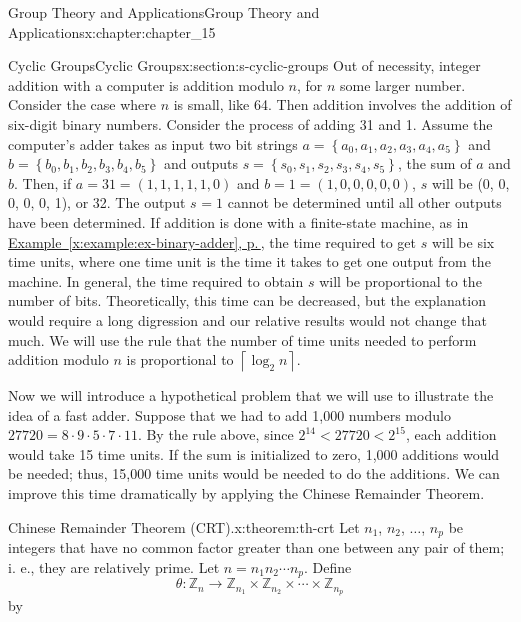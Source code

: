 \documentclass[twoside,10pt,]{book}
\newcommand{\xreffont}{\relax}
\numberwithin{equation}{section}
\begin{document}
\begin{chapterptx}{Group Theory and Applications}{}{Group Theory and Applications}{}{}{x:chapter:chapter_15}
\begin{sectionptx}{Cyclic Groups}{}{Cyclic Groups}{}{}{x:section:s-cyclic-groups}
Out of necessity, integer addition with a computer is addition modulo \(n\), for \(n\) some larger number. Consider the case where \(n\) is small, like 64. Then addition involves the addition of six-digit binary numbers. Consider the process of adding 31 and 1. Assume the computer's adder takes as input two bit strings  \(a = \left\{a_0,a_1,a_2,a_3,a_4,a_5\right\}\) and \(b=\left\{b_0,b_1,b_2,b_3,b_4,b_5\right\}\) and outputs \(s = \left\{s_0,s_1,s_2,s_3,s_4,s_5\right\}\), the sum of \(a\) and \(b\). Then, if \(a = 31 = (1, 1, 1, 1, 1, 0)\) and \(b = 1 = (1, 0, 0, 0, 0, 0)\), \(s\) will be (0, 0, 0, 0, 0, 1), or 32. The output \(s_{ }=1\) cannot be determined until all other outputs have been determined. If addition is done with a finite-state machine, as in \hyperref[x:example:ex-binary-adder]{Example~{\xreffont\ref{x:example:ex-binary-adder}}, p.\,\pageref{x:example:ex-binary-adder}}, the time required to get \(s\) will be six time units, where one time unit is the time it takes to get one output from the machine.  In general, the time required to obtain \(s\) will be proportional to the number of bits.   Theoretically, this time can be decreased, but the explanation would require a long digression and our relative results would not change that much. We will use the rule that the number of time units needed to perform addition modulo \(n\) is proportional to  \(\left\lceil \log_2n\right\rceil\).%
\par
Now we will introduce a hypothetical problem that we will use to illustrate the idea of a fast adder. Suppose that we had to add 1,000 numbers modulo \(27720 = 8 \cdot  9 \cdot  5 \cdot 7\cdot 11\). By the rule above, since \(2^{14} < 27720 < 2^{15}\), each addition would take 15 time units. If the sum is initialized to zero, 1,000 additions would be needed; thus, 15,000 time units would be needed to do the additions. We can improve this time dramatically by applying the Chinese Remainder Theorem.%
\begin{theorem}{Chinese Remainder Theorem (CRT).}{}{x:theorem:th-crt}%
%
%
Let \(n_1\), \(n_2\), \(\ldots\), \(n_p\) be integers that have no common factor greater than one between any pair of them; i. e., they are relatively prime.  Let \(n = n_1n_2\cdots  n_p\). Define%
\begin{equation*}
\theta:\mathbb{Z}_n\to  \mathbb{Z}_{n_1}\times \mathbb{Z}_{n_2}\times  \cdots \times \mathbb{Z}_{n_p}
\end{equation*}
by%
\begin{equation*}

\end{equation*}
\end{theorem}
\end{sectionptx}
\end{chapterptx}
\end{document}
